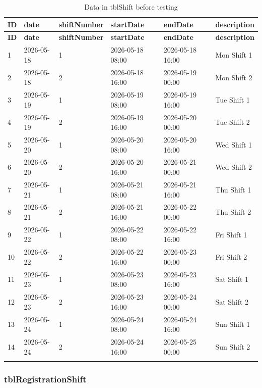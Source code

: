 \begin{longtable}{|p{}|p{}|p{}|p{}|p{}|p{}|}
\hline
\textbf{ID} & \textbf{date} & \textbf{shiftNumber} & \textbf{startDate} & \textbf{endDate} & \textbf{description} \\
\hline
\endfirsthead
\hline
\textbf{ID} & \textbf{date} & \textbf{shiftNumber} & \textbf{startDate} & \textbf{endDate} & \textbf{description} \\
\hline
\endhead
1 & 2026-05-18 & 1 & 2026-05-18 08:00 & 2026-05-18 16:00 & Mon Shift 1 \\
\hline
2 & 2026-05-18 & 2 & 2026-05-18 16:00 & 2026-05-19 00:00 & Mon Shift 2 \\
\hline
3 & 2026-05-19 & 1 & 2026-05-19 08:00 & 2026-05-19 16:00 & Tue Shift 1 \\
\hline
4 & 2026-05-19 & 2 & 2026-05-19 16:00 & 2026-05-20 00:00 & Tue Shift 2 \\
\hline
5 & 2026-05-20 & 1 & 2026-05-20 08:00 & 2026-05-20 16:00 & Wed Shift 1 \\
\hline
6 & 2026-05-20 & 2 & 2026-05-20 16:00 & 2026-05-21 00:00 & Wed Shift 2 \\
\hline
7 & 2026-05-21 & 1 & 2026-05-21 08:00 & 2026-05-21 16:00 & Thu Shift 1 \\
\hline
8 & 2026-05-21 & 2 & 2026-05-21 16:00 & 2026-05-22 00:00 & Thu Shift 2 \\
\hline
9 & 2026-05-22 & 1 & 2026-05-22 08:00 & 2026-05-22 16:00 & Fri Shift 1 \\
\hline
10 & 2026-05-22 & 2 & 2026-05-22 16:00 & 2026-05-23 00:00 & Fri Shift 2 \\
\hline
11 & 2026-05-23 & 1 & 2026-05-23 08:00 & 2026-05-23 16:00 & Sat Shift 1 \\
\hline
12 & 2026-05-23 & 2 & 2026-05-23 16:00 & 2026-05-24 00:00 & Sat Shift 2 \\
\hline
13 & 2026-05-24 & 1 & 2026-05-24 08:00 & 2026-05-24 16:00 & Sun Shift 1 \\
\hline
14 & 2026-05-24 & 2 & 2026-05-24 16:00 & 2026-05-25 00:00 & Sun Shift 2 \\
\hline
\caption{Data in tblShift before testing}\label{tab:testing-shift-before}
\end{longtable}

\subsubsection*{tblRegistrationShift}

